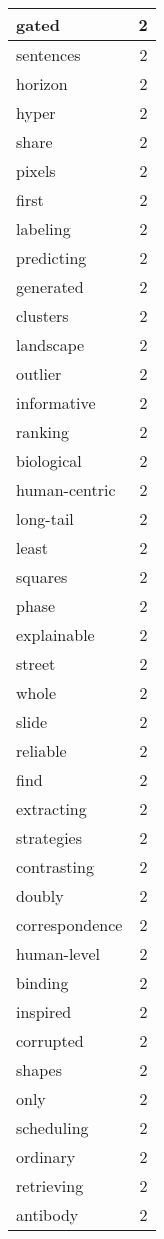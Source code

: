 \begin{table}[h]
\begin{tabular}{|l|r|}
gated & 2 \\
\hline
sentences & 2 \\
\hline
horizon & 2 \\
\hline
hyper & 2 \\
\hline
share & 2 \\
\hline
pixels & 2 \\
\hline
first & 2 \\
\hline
labeling & 2 \\
\hline
predicting & 2 \\
\hline
generated & 2 \\
\hline
clusters & 2 \\
\hline
landscape & 2 \\
\hline
outlier & 2 \\
\hline
informative & 2 \\
\hline
ranking & 2 \\
\hline
biological & 2 \\
\hline
human-centric & 2 \\
\hline
long-tail & 2 \\
\hline
least & 2 \\
\hline
squares & 2 \\
\hline
phase & 2 \\
\hline
explainable & 2 \\
\hline
street & 2 \\
\hline
whole & 2 \\
\hline
slide & 2 \\
\hline
reliable & 2 \\
\hline
find & 2 \\
\hline
extracting & 2 \\
\hline
strategies & 2 \\
\hline
contrasting & 2 \\
\hline
doubly & 2 \\
\hline
correspondence & 2 \\
\hline
human-level & 2 \\
\hline
binding & 2 \\
\hline
inspired & 2 \\
\hline
corrupted & 2 \\
\hline
shapes & 2 \\
\hline
only & 2 \\
\hline
scheduling & 2 \\
\hline
ordinary & 2 \\
\hline
retrieving & 2 \\
\hline
antibody & 2 \\

\end{tabular}
\end{table}
